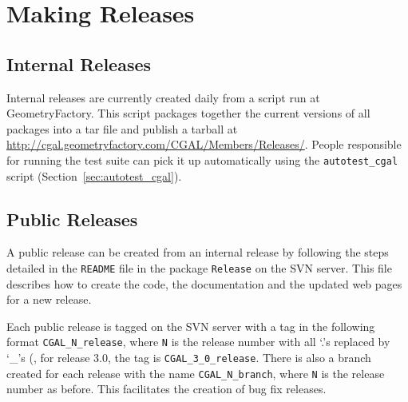 \chapter{Making Releases\label{chap:releases}}

\section{Internal Releases\label{sec:internal_releases}}

Internal releases are currently created daily from a script run
at GeometryFactory.  This script packages together the current versions of all
packages into a tar file and publish a tarball at
\url{http://cgal.geometryfactory.com/CGAL/Members/Releases/}.
People responsible for running the test suite can pick it up automatically
using the {\tt autotest\_cgal} script (Section~\ref{sec:autotest_cgal}).

\section{Public Releases\label{sec:public_releases}}

A public release can be created from an internal release by following the
steps detailed in the
\texttt{README} file in the package \texttt{Release} on the SVN server.
This file describes how to create the code, the documentation and the
updated web pages for a new release.

Each public release is tagged on the SVN server with a tag in the following
format \texttt{CGAL\_N\_release}, where \texttt{N} is the release number
with all `.'s replaced by `\_'s (\eg, for release 3.0, the tag is
\texttt{CGAL\_3\_0\_release}.  There is also a branch created for
each release with the name \texttt{CGAL\_N\_branch}, where \texttt{N} is
the release number as before.  This facilitates the creation of bug fix
releases.

